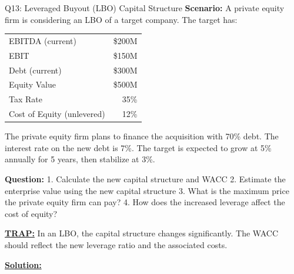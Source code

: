 \documentclass{beamer}
\renewcommand{\scriptsize}{\fontsize{6pt}{7pt}\selectfont}
\begin{document}
	\begin{frame}{Q13: Leveraged Buyout (LBO) Capital Structure}
		\scriptsize
		\textbf{Scenario:} A private equity firm is considering an LBO of a target company. The target has:
		
		\begin{tabular}{lr}
			EBITDA (current) & \$200M \\
			EBIT & \$150M \\
			Debt (current) & \$300M \\
			Equity Value & \$500M \\
			Tax Rate & 35\% \\
			Cost of Equity (unlevered) & 12\% \\
		\end{tabular}
		
		The private equity firm plans to finance the acquisition with 70\% debt. The interest rate on the new debt is 7\%. The target is expected to grow at 5\% annually for 5 years, then stabilize at 3\%.
		
		\textbf{Question:}
		1. Calculate the new capital structure and WACC
		2. Estimate the enterprise value using the new capital structure
		3. What is the maximum price the private equity firm can pay?
		4. How does the increased leverage affect the cost of equity?
		
		\vspace{2pt}
		\underline{\textbf{TRAP:}} In an LBO, the capital structure changes significantly. The WACC should reflect the new leverage ratio and the associated costs.
		
		\vspace{4pt}
		\underline{\textbf{Solution:}}
	\end{frame}
	
\end{document}
